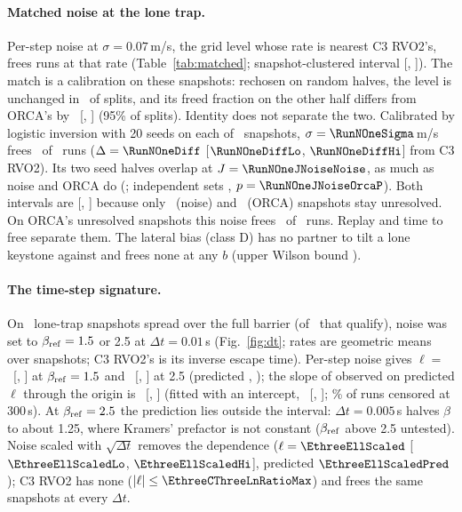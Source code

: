 \paragraph{Matched noise at the lone trap.}
Per-step noise at $\sigma=0.07$\,m/s, the grid level whose rate is nearest C3 RVO2's, frees runs at that rate (Table~\ref{tab:matched}; snapshot-clustered interval [\FixAsixLKNoiseCClLo, \FixAsixLKNoiseCClHi]). The match is a calibration on these snapshots: rechosen on random halves, the level is unchanged in \FixAtwoLoneSameSigma\ of splits, and its freed fraction on the other half differs from ORCA's by \FixAtwoLoneDelta\ [\FixAtwoLoneDeltaLo, \FixAtwoLoneDeltaHi] (95\% of splits). Identity does not separate the two. Calibrated by logistic inversion with 20 seeds on each of \RunNOneSnapN\ snapshots, $\sigma=\RunNOneSigma$\,m/s frees \RunNOneFreed\ of \RunNOneRunsN\ runs ($\Delta=\RunNOneDiff$ [$\RunNOneDiffLo$, $\RunNOneDiffHi$] from C3 RVO2). Its two seed halves overlap at $J=\RunNOneJNoiseNoise$, as much as noise and ORCA do (\RunNOneJNoiseOrca; independent sets \RunNOneJNoiseOrcaIndep, $p=\RunNOneJNoiseOrcaP$). Both intervals are [\RunNOneJNoiseOrcaLo, \RunNOneJNoiseOrcaHi] because only \RunNOneUnresNoise\ (noise) and \RunNOneUnresOrca\ (ORCA) snapshots stay unresolved. On ORCA's unresolved snapshots this noise frees \RunNOneFreedOnHeld\ of \RunNOneRunsOnHeld\ runs. Replay and time to free separate them. The lateral bias (class D) has no partner to tilt a lone keystone against and frees none at any $b$ (upper Wilson bound \EtwoMaxBiasUpperLK).

\paragraph{The time-step signature.}
On \EthreeN\ lone-trap snapshots spread over the full barrier (of \FixAthreeEthreeQual\ that qualify), noise was set to $\beta_{\rm ref}=1.5$ or 2.5 at $\Delta t=0.01$\,s (Fig.~\ref{fig:dt}; rates are geometric means over snapshots; C3 RVO2's is its inverse escape time). Per-step noise gives $\ell=$ \EthreeEllBA\ [\EthreeEllBALo, \EthreeEllBAHi] at $\beta_{\rm ref}=1.5$ and \EthreeEllBB\ [\EthreeEllBBLo, \EthreeEllBBHi] at 2.5 (predicted \EthreeEllBAPred, \EthreeEllBBPred); the slope of observed on predicted $\ell$ through the origin is \EthreeSlope\ [\EthreeSlopeLo, \EthreeSlopeHi] (fitted with an intercept, \FixAthreeOLSSlope\ [\FixAthreeOLSSlopeLo, \FixAthreeOLSSlopeHi]; \FixAthreeCensLongPct\% of runs censored at 300\,s). At $\beta_{\rm ref}=2.5$ the prediction lies outside the interval: $\Delta t=0.005$\,s halves $\beta$ to about 1.25, where Kramers' prefactor is not constant ($\beta_{\rm ref}$ above 2.5 untested). Noise scaled with $\sqrt{\Delta t}$ removes the dependence ($\ell=\EthreeEllScaled$ [$\EthreeEllScaledLo$, $\EthreeEllScaledHi$], predicted $\EthreeEllScaledPred$); C3 RVO2 has none ($|\ell|\le\EthreeCThreeLnRatioMax$) and frees the same snapshots at every $\Delta t$.

